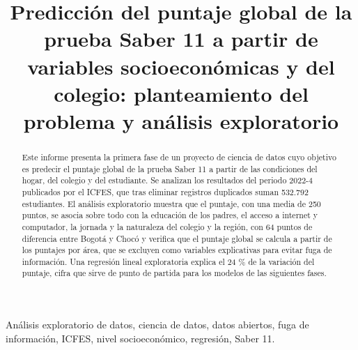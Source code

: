 \documentclass[conference]{IEEEtran}
\renewcommand{\_}{\textunderscore\allowbreak{}}
\begin{document}
    \raggedbottom

    \title{
        Predicción del puntaje global de la prueba Saber 11 a partir de variables
        socioeconómicas y del colegio: planteamiento del problema y análisis exploratorio
    }

    \author{
    }

    \maketitle
    \thispagestyle{plain}

    \begin{abstract}
        Este informe presenta la primera fase de un proyecto de ciencia de datos
        cuyo objetivo es predecir el puntaje global de la prueba Saber 11 a partir
        de las condiciones del hogar, del colegio y del estudiante. Se analizan los
        resultados del periodo 2022-4 publicados por el ICFES, que tras eliminar
        registros duplicados suman 532.792 estudiantes. El análisis exploratorio
        muestra que el puntaje, con una media de 250 puntos, se asocia sobre todo
        con la educación de los padres, el acceso a internet y computador, la
        jornada y la naturaleza del colegio y la región, con 64 puntos de diferencia
        entre Bogotá y Chocó y verifica que el puntaje global se calcula a partir 
        de los puntajes por área, que se excluyen como variables explicativas 
        para evitar fuga de información. Una regresión lineal exploratoria 
        explica el 24 \% de la variación del puntaje, cifra que sirve de punto 
        de partida para los modelos de las siguientes fases.
    \end{abstract}

    \vspace{10pt}

    \begin{IEEEkeywords}
        Análisis exploratorio de datos, ciencia de datos, datos abiertos, fuga de 
        información, ICFES, nivel socioeconómico, regresión, Saber 11.
    \end{IEEEkeywords}

    
    
    
    
    
    

    \appendices
    

    
    
\end{document}
